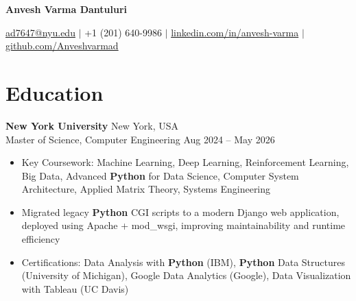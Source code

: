 \documentclass[letterpaper,10pt]{article}
\begin{document}
\begin{center}
    {\Huge\textbf{Anvesh Varma Dantuluri}}
    \vspace{2pt}
    
    \href{mailto:ad7647@nyu.edu}{\color{black}ad7647@nyu.edu} $|$ +1 (201) 640-9986 $|$ \href{https://linkedin.com/in/anvesh-varma}{\color{black}linkedin.com/in/anvesh-varma} $|$ \href{https://github.com/Anveshvarmad}{\color{black}github.com/Anveshvarmad}
    \vspace{8pt} %
\end{center}

\section*{Education}
\vspace{-5pt} %
\RaggedRight %

\textbf{New York University} \hfill New York, USA \\
Master of Science, Computer Engineering \hfill Aug 2024 – May 2026
\begin{itemize}[leftmargin=*,label=\textbullet]
    \item Key Coursework: Machine Learning, Deep Learning, Reinforcement Learning, Big Data, Advanced \textbf{Python} for Data Science, Computer System Architecture, Applied Matrix Theory, Systems Engineering
    \item Migrated legacy \textbf{Python} CGI scripts to a modern Django web application, deployed using Apache + mod\_wsgi, improving maintainability and runtime efficiency
    \item Certifications: Data Analysis with \textbf{Python} (IBM), \textbf{Python} Data Structures (University of Michigan), Google Data Analytics (Google), Data Visualization with Tableau (UC Davis)
\end{itemize}

\end{document}

